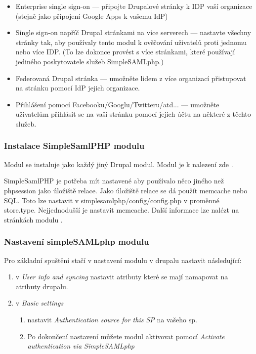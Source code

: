     \begin{itemize}
        \item Enterprise single sign-on --- připojte Drupalové stránky k IDP vaší organizace (stejně jako připojení Google Apps k vašemu IdP)
        \item Single sign-on napříč Drupal stránkami na více serverech --- nastavte všechny stránky tak, aby používaly tento modul k ověřování uživatelů proti jednomu nebo více IDP. (To lze dokonce provést s více stránkami, které používají jediného poskytovatele služeb SimpleSAMLphp.)
        \item Federovaná Drupal stránka --- umožněte lidem z více organizací přistupovat na stránku pomocí IdP jejich organizace.
        \item Přihlášení pomocí Facebooku/Googlu/Twitteru/atd... --- umožněte uživatelům přihlásit se na vaši stránku pomocí jejich účtu na některé z těchto služeb.
    \end{itemize}
    
\subsubsection{Instalace SimpleSamlPHP modulu} %

Modul se instaluje jako každý jiný Drupal modul. Modul je k nalezení zde \cite{SimpleSAMLphpDrupal}.

SimpleSamlPHP je potřeba mít nastavené aby používalo něco jiného než phpsession jako úložiště relace. Jako úložiště relace se dá použít memcache nebo SQL.
Toto lze nastavit v simplesamlphp/config/config.php v proměnné store.type.
Nejjednodušší je nastavit memcache. Další informace lze nalézt na stránkách modulu \cite{SimpleSAMLphpDrupal}.

\subsubsection{Nastavení simpleSAMLphp modulu} %

Pro základní spuštění stačí v nastavení modulu v drupalu nastavit následující:

\begin{enumerate}
    \item v \emph{User info and syncing} nastavit atributy které se mají namapovat na atributy drupalu.
    \item v \emph{Basic settings}
    \begin{enumerate}
        \item nastavit \emph{Authentication source for this SP} na vašeho sp.
        \item Po dokončení nastavení můžete modul aktivovat pomocí \emph{Activate authentication via SimpleSAMLphp}
    \end{enumerate}

\end{enumerate}



